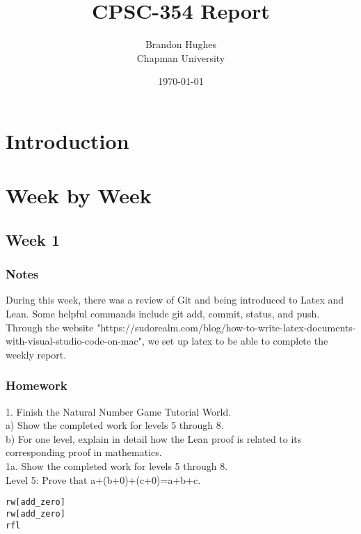 \documentclass{article}
\title{CPSC-354 Report}
\author{Brandon Hughes \\ Chapman University}
\date{\today}
\theoremstyle{theorem}
\theoremstyle{definition}
\theoremstyle{remark}
\begin{document}
\maketitle

\begin{abstract}
\end{abstract}

\setcounter{tocdepth}{3}
\tableofcontents

\section{Introduction}\label{intro}

\section{Week by Week}\label{homework}

\subsection{Week 1}

\subsubsection{Notes}

During this week, there was a review of Git and being introduced to Latex and Lean. Some helpful commands include git add, commit, status, and push. 
Through the website "https://sudorealm.com/blog/how-to-write-latex-documents-with-visual-studio-code-on-mac", we set up latex to be able to complete the weekly report.

\subsubsection{Homework}

1. Finish the Natural Number Game Tutorial World. \\
\hspace*{2em}a) Show the completed work for levels 5 through 8. \\
\hspace*{2em}b) For one level, explain in detail how the Lean proof is related to its corresponding proof in mathematics. \\

1a. Show the completed work for levels 5 through 8. \\
Level 5: Prove that a+(b+0)+(c+0)=a+b+c.
\begin{lstlisting}
rw[add_zero]
rw[add_zero]
rfl
\end{lstlisting}
\end{document}
